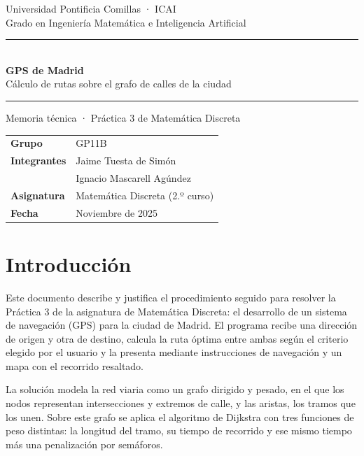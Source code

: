 \documentclass[11pt,a4paper]{article}
\begin{document}
\begin{titlepage}
\sffamily
\vspace*{1.5cm}
{\large Universidad Pontificia Comillas · ICAI\\[2pt]
Grado en Ingeniería Matemática e Inteligencia Artificial}

\vspace{3.2cm}
{\color{azul}\rule{\linewidth}{1.2pt}}\\[14pt]
{\fontsize{28}{34}\selectfont\bfseries\color{azul} GPS de Madrid}\\[8pt]
{\Large Cálculo de rutas sobre el grafo de calles de la ciudad}\\[10pt]
{\color{azul}\rule{\linewidth}{1.2pt}}

\vspace{1cm}
{\large Memoria técnica · Práctica 3 de Matemática Discreta}

\vfill
\begin{tabularx}{\linewidth}{@{}lX@{}}
\textbf{Grupo} & GP11B\\[3pt]
\textbf{Integrantes} & Jaime Tuesta de Simón\\
 & Ignacio Mascarell Agúndez\\[3pt]
\textbf{Asignatura} & Matemática Discreta (2.º curso)\\[3pt]
\textbf{Fecha} & Noviembre de 2025\\
\end{tabularx}
\vspace{1cm}
\end{titlepage}

\tableofcontents
\clearpage

\section{Introducción}

Este documento describe y justifica el procedimiento seguido para resolver la Práctica 3 de la asignatura de Matemática Discreta: el desarrollo de un sistema de navegación (GPS) para la ciudad de Madrid. El programa recibe una dirección de origen y otra de destino, calcula la ruta óptima entre ambas según el criterio elegido por el usuario y la presenta mediante instrucciones de navegación y un mapa con el recorrido resaltado.

La solución modela la red viaria como un grafo dirigido y pesado, en el que los nodos representan intersecciones y extremos de calle, y las aristas, los tramos que los unen. Sobre este grafo se aplica el algoritmo de Dijkstra con tres funciones de peso distintas: la longitud del tramo, su tiempo de recorrido y ese mismo tiempo más una penalización por semáforos.
\end{document}
